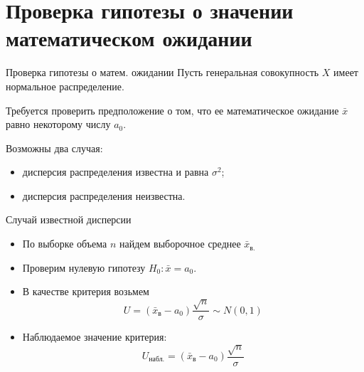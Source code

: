 \documentclass[unicode,11pt,notheorems,xcolor=table]{beamer}
\begin{document}
\section{Проверка гипотезы о значении математическом ожидании}
\begin{frame}{Проверка гипотезы о матем. ожидании}{}
    Пусть генеральная совокупность $X$ имеет нормальное распределение.

    \vspace{1cm}

    \alert{Требуется проверить предположение о том, что ее математическое ожидание  $\bar{x}$ равно некоторому числу $a_0$.}
    
    \vspace{1cm}
    Возможны два случая:
    \begin{itemize}
        \item дисперсия распределения известна и равна $\sigma^2$;
        \item дисперсия распределения неизвестна.
    \end{itemize}
\end{frame}
\begin{frame}{Случай известной дисперсии}{}

    \begin{itemize}
        \item По выборке объема $n$ найдем выборочное среднее 
        $\bar{x}_\text{в.}$
        \item Проверим нулевую гипотезу $H_0\colon \bar{x} = a_0$.
        \item В качестве критерия возьмем
        $$
            U=\left(\bar{x}_\text{в}-a_0\right)\frac{\sqrt{n}}{\sigma} \sim N(0,1)
        $$
        \item Наблюдаемое значение критерия:
        $$
            U_\text{набл.}=\left(\bar{x}_\text{в}-a_0\right)\frac{\sqrt{n}}{\sigma}
        $$
    \end{itemize}
\end{frame}
\end{document}
